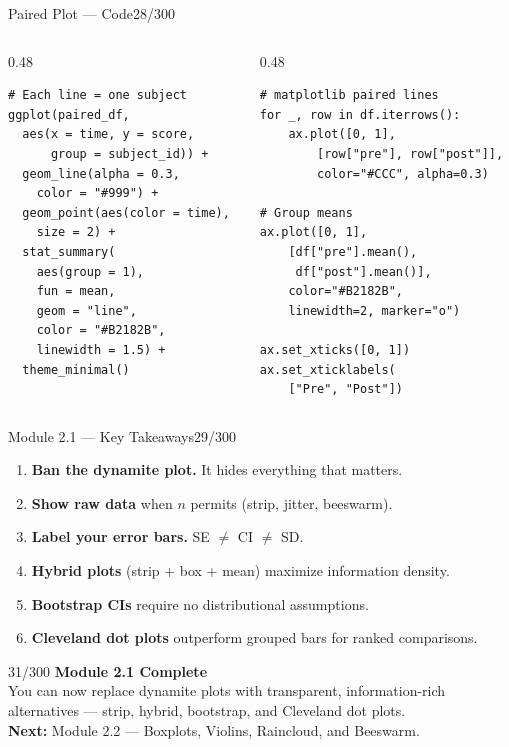\documentclass[10pt]{beamer}
\newcommand{\smark}[1]{\hfill{\scriptsize\color{codegray}#1}}
\begin{document}
\begin{frame}[fragile]{Paired Plot --- Code}\smark{28/300}
\begin{columns}[T]
\begin{column}{0.48\textwidth}
\begin{lstlisting}[style=Rstyle]
# Each line = one subject
ggplot(paired_df,
  aes(x = time, y = score,
      group = subject_id)) +
  geom_line(alpha = 0.3,
    color = "#999") +
  geom_point(aes(color = time),
    size = 2) +
  stat_summary(
    aes(group = 1),
    fun = mean,
    geom = "line",
    color = "#B2182B",
    linewidth = 1.5) +
  theme_minimal()
\end{lstlisting}
\end{column}
\begin{column}{0.48\textwidth}
\begin{lstlisting}[style=Pystyle]
# matplotlib paired lines
for _, row in df.iterrows():
    ax.plot([0, 1],
        [row["pre"], row["post"]],
        color="#CCC", alpha=0.3)

# Group means
ax.plot([0, 1],
    [df["pre"].mean(),
     df["post"].mean()],
    color="#B2182B",
    linewidth=2, marker="o")

ax.set_xticks([0, 1])
ax.set_xticklabels(
    ["Pre", "Post"])
\end{lstlisting}
\end{column}
\end{columns}
\end{frame}

\begin{frame}{Module 2.1 --- Key Takeaways}\smark{29/300}
\begin{enumerate}
    \item \textbf{Ban the dynamite plot.} It hides everything that matters.
    \item \textbf{Show raw data} when $n$ permits (strip, jitter, beeswarm).
    \item \textbf{Label your error bars.} SE $\neq$ CI $\neq$ SD.
    \item \textbf{Hybrid plots} (strip + box + mean) maximize information density.
    \item \textbf{Bootstrap CIs} require no distributional assumptions.
    \item \textbf{Cleveland dot plots} outperform grouped bars for ranked comparisons.
\end{enumerate}
\end{frame}

\begin{frame}{}\smark{31/300}
\centering\vspace{1.5cm}
{\Large\textbf{Module 2.1 Complete}}\\[0.5cm]
You can now replace dynamite plots with transparent, information-rich alternatives --- strip, hybrid, bootstrap, and Cleveland dot plots.\\[0.5cm]
\textbf{Next:} Module 2.2 --- Boxplots, Violins, Raincloud, and Beeswarm.
\end{frame}
\end{document}
